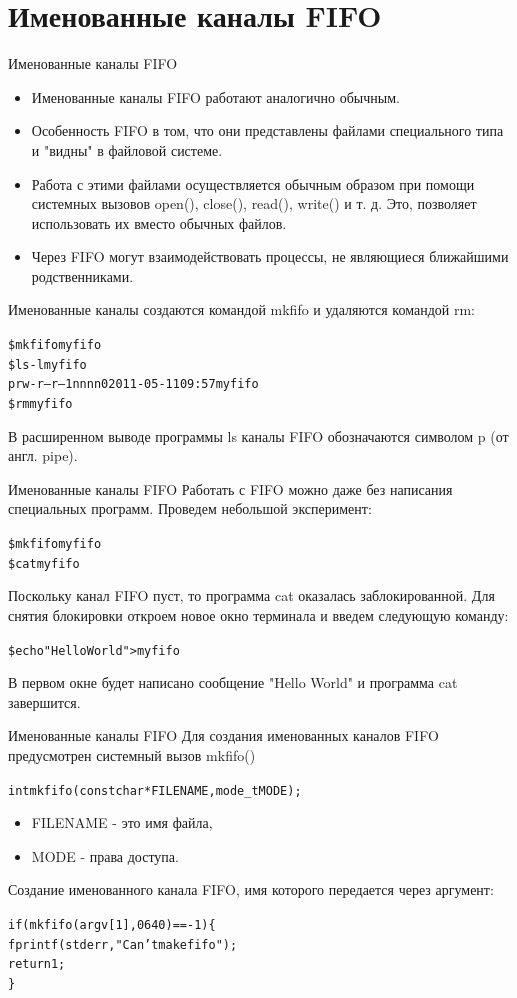 \documentclass[xcolor=table]{beamer}
\begin{document}
\section{Именованные каналы FIFO}

\begin{frame}[fragile]{Именованные каналы FIFO}
\begin{itemize}
\item Именованные каналы FIFO работают аналогично обычным. 
\item Особенность FIFO в том, что они представлены файлами специального типа и "видны" в файловой системе. 
\item Работа с этими файлами осуществляется обычным образом при помощи системных вызовов open(), close(), read(), write() и т. д. Это, позволяет использовать их вместо обычных файлов. 
\item Через FIFO могут взаимодействовать процессы, не являющиеся ближайшими родственниками.
\end{itemize}

Именованные каналы создаются командой mkfifo и удаляются командой rm:
\begin{alltt}
\$ mkfifo myfifo
\$ ls -l myfifo
prw-r--r-- 1 nn nn 0 2011-05-11 09:57 myfifo
\$ rm myfifo
\end{alltt}
В расширенном выводе программы ls каналы FIFO обозначаются символом p (от англ. pipe). 
\end{frame}

\begin{frame}[fragile]{Именованные каналы FIFO}
Работать с FIFO можно даже без написания специальных программ. Проведем небольшой эксперимент:
\begin{alltt}
\$ mkfifo myfifo
\$ cat myfifo
\end{alltt}
Поскольку канал FIFO пуст, то программа cat оказалась заблокированной. Для снятия блокировки откроем новое окно терминала и введем следующую команду:
\begin{alltt}
\$ echo "Hello World" > myfifo
\end{alltt}
В первом окне будет написано сообщение "Hello World" и программа cat завершится.
\end{frame}

\begin{frame}[fragile]{Именованные каналы FIFO}
Для создания именованных каналов FIFO предусмотрен системный вызов mkfifo()
\begin{alltt}
int mkfifo (const char * FILENAME, mode_t MODE);
\end{alltt}
\begin{itemize}
\item FILENAME - это имя файла, 
\item MODE - права доступа. 
\end{itemize}

Создание именованного канала FIFO, имя которого передается через аргумент:
\begin{alltt}
if (mkfifo (argv[1], 0640) == -1) \{
  fprintf (stderr, "Can't make fifo");
  return 1;
\}
\end{alltt}
\end{frame}
\end{document}
